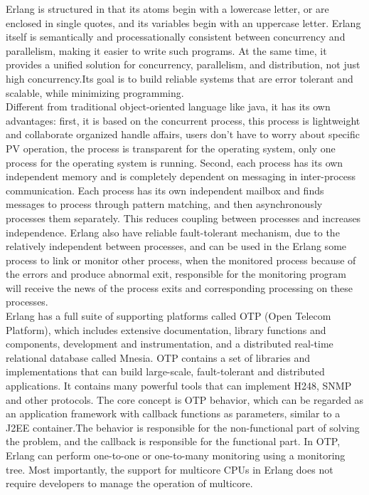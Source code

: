 \documentclass{article}
\begin{document}
Erlang is structured in that its atoms begin with a lowercase letter, or are enclosed in single quotes, and its variables begin with an uppercase letter. Erlang itself is semantically and processationally consistent between concurrency and parallelism, making it easier to write such programs.  At the same time, it provides a unified solution for concurrency, parallelism, and distribution, not just high concurrency.Its goal is to build reliable systems that are error tolerant and scalable, while minimizing programming.\\

Different from traditional object-oriented language like java, it has its own advantages: first, it is based on the concurrent process, this process is lightweight and collaborate organized handle affairs, users don't have to worry about specific PV operation, the process is transparent for the operating system, only one process for the operating system is running. Second, each process has its own independent memory and is completely dependent on messaging in inter-process communication. Each process has its own independent mailbox and finds messages to process through pattern matching, and then asynchronously processes them separately. This reduces coupling between processes and increases independence. Erlang also have reliable fault-tolerant mechanism, due to the relatively independent between processes, and can be used in the Erlang some process to link or monitor other process, when the monitored process because of the errors and produce abnormal exit, responsible for the monitoring program will receive the news of the process exits and corresponding processing on these processes.\\

Erlang has a full suite of supporting platforms called OTP (Open Telecom Platform), which includes extensive documentation, library functions and components, development and instrumentation, and a distributed real-time relational database called Mnesia. OTP contains a set of libraries and implementations that can build large-scale, fault-tolerant and distributed applications. It contains many powerful tools that can implement H248, SNMP and other protocols. The core concept is OTP behavior, which can be regarded as an application framework with callback functions as parameters, similar to a J2EE container.The behavior is responsible for the non-functional part of solving the problem, and the callback is responsible for the functional part. In OTP, Erlang can perform one-to-one or one-to-many monitoring using a monitoring tree. Most importantly, the support for multicore CPUs in Erlang does not require developers to manage the operation of multicore. \\
\end{document}
